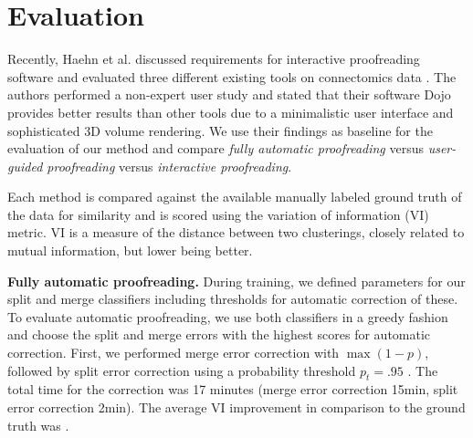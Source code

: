 \section{Evaluation}

Recently, Haehn et al. discussed requirements for interactive proofreading software and evaluated three different existing tools on connectomics data \cite{haehn_dojo_2014}. The authors performed a non-expert user study and stated that their software Dojo provides better results than other tools due to a minimalistic user interface and sophisticated 3D volume rendering. We use their findings as baseline for the evaluation of our method and compare \textit{fully automatic proofreading} versus \textit{user-guided proofreading} versus \textit{interactive proofreading}. 

 Each method is compared against the available manually labeled ground truth of the data for similarity and is scored using the variation of information (VI) metric. VI is a measure of the distance between two clusterings, closely related to mutual information, but lower being better. 



\textbf{Fully automatic proofreading.} During training, we defined parameters for our split and merge classifiers including thresholds for automatic correction of these. To evaluate automatic proofreading, we use both classifiers in a greedy fashion and choose the split and merge errors with the highest scores for automatic correction. First, we performed merge error correction with $\max(1-p)$, followed by split error correction using a probability threshold $p_t=.95$ . The total time for the correction was 17 minutes (merge error correction 15min, split error correction 2min). The average VI improvement in comparison to the ground truth was .

